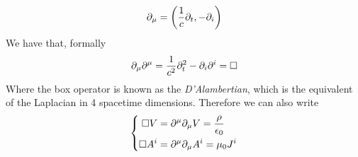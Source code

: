 \documentclass[../electromagnetism.tex]{subfiles}
\begin{document}
\begin{equation}
	\partial_\mu=\left( \frac{1}{c}\partial_t,-\partial_i \right)
	\label{eq:4-gradient-mwpot}
\end{equation}
We have that, formally
\begin{equation*}
	\partial_\mu\partial^\mu=\frac{1}{c^2}\partial^2_t-\partial_i\partial^i=\square
\end{equation*}
Where the box operator is known as the \textit{D'Alambertian}, which is the equivalent of the Laplacian in 4 spacetime dimensions. Therefore we can also write
\begin{equation}
	\left\{\begin{aligned}
		\square V&= \partial^\mu\partial_\mu V=\frac{\rho}{\epsilon_0}\\
		\square A^i&= \partial^\mu\partial_\mu A^i=\mu_0J^i
	\end{aligned}\right.
	\label{eq:relativisticwaveeq-mwpot}
\end{equation}
\end{document}
